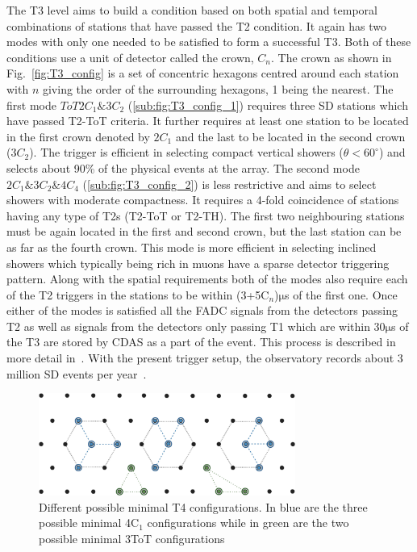 The T3 level aims to build a condition based on both spatial and temporal combinations of stations that have passed the T2 condition. It again has two modes with only one needed to be satisfied to form a successful T3. Both of these conditions use a unit of detector called the crown, $C_n$. The crown as shown in Fig.~\ref{fig:T3_config} is a set of concentric hexagons centred around each station with $n$ giving the order of the surrounding hexagons, 1 being the nearest. The first mode $ToT2C_1\&3C_2$ (\ref{sub:fig:T3_config_1}) requires three SD stations which have passed T2-ToT criteria. It further requires at least one station to be located in the first crown denoted by $2C_1$ and the last to be located in the second crown ($3C_2$). The trigger is efficient in selecting compact vertical showers ($\theta < 60^{\circ}$) and selects about 90\% of the physical events at the array. The second mode $2C_1\&3C_2\&4C_4$ (\ref{sub:fig:T3_config_2}) is less restrictive and aims to select showers with moderate compactness. It requires a 4-fold coincidence of stations having any type of T2s (T2-ToT or T2-TH). The first two neighbouring stations must be again located in the first and second crown, but the last station can be as far as the fourth crown. This mode is more efficient in selecting inclined showers which typically being rich in muons have a sparse detector triggering pattern. Along with the spatial requirements both of the modes also require each of the T2 triggers in the stations to be within (3+5C$_n$)$\mathrm{\mu}$s of the first one. Once either of the modes is satisfied all the FADC signals from the detectors passing T2 as well as signals from the detectors only passing T1 which are within 30$\mathrm{\mu}$s of the T3 are stored by CDAS as a part of the event. This process is described in more detail in~\cite{Auger:2015}. With the present trigger setup, the observatory records about 3 million SD events per year~\cite{Auger:2015}. 


\begin{figure}[t!]
  \centering
  \includegraphics[width=0.75\textwidth]{thesis_figures/Setup/T4_modes.png}
  \caption{Different possible minimal T4 configurations. In blue are the three possible minimal 4C$_1$ configurations while in green are the two possible minimal 3ToT configurations}
  \label{fig:T4_config}
\end{figure}



